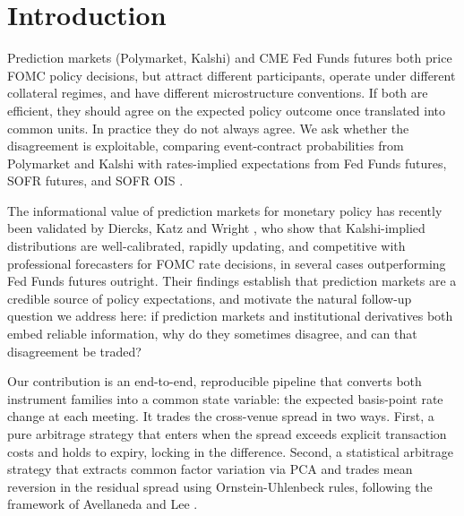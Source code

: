 
\section{Introduction}
Prediction markets (Polymarket, Kalshi) and CME Fed Funds futures both price FOMC policy decisions, but attract different participants, operate under different collateral regimes, and have different microstructure conventions. If both are efficient, they should agree on the expected policy outcome once translated into common units. In practice they do not always agree. We ask whether the disagreement is exploitable, comparing event-contract probabilities from Polymarket and Kalshi \cite{wolfers2004prediction,arrow2008promise} with rates-implied expectations from Fed Funds futures, SOFR futures, and SOFR OIS \cite{kuttner2001monetary,piazzesi2008futures,gurkaynak2007market}.

The informational value of prediction markets for monetary policy has recently been validated by Diercks, Katz and Wright \cite{diercks2026kalshi}, who show that Kalshi-implied distributions are well-calibrated, rapidly updating, and competitive with professional forecasters for FOMC rate decisions, in several cases outperforming Fed Funds futures outright. Their findings establish that prediction markets are a credible source of policy expectations, and motivate the natural follow-up question we address here: if prediction markets and institutional derivatives both embed reliable information, why do they sometimes disagree, and can that disagreement be traded?

Our contribution is an end-to-end, reproducible pipeline that converts both instrument families into a common state variable: the expected basis-point rate change at each meeting. It trades the cross-venue spread in two ways. First, a pure arbitrage strategy that enters when the spread exceeds explicit transaction costs and holds to expiry, locking in the difference. Second, a statistical arbitrage strategy that extracts common factor variation via PCA and trades mean reversion in the residual spread using Ornstein-Uhlenbeck rules, following the framework of Avellaneda and Lee \cite{avellaneda2010statarb}.




